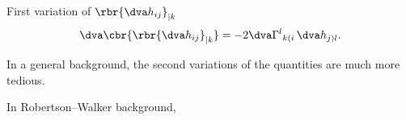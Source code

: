 \documentclass[a4paper,11pt]{article}
\begin{document}
First variation of $\rbr{\dva h_{ij}}_{|k}$
\begin{align}
\dva\cbr{\rbr{\dva h_{ij}}_{|k}} = -2 \dva\Gamma^l{}_{k(i}\,\dva h_{j)l}.
\end{align}



In a general background, the second variations of the quantities are much more 
tedious.

In Robertson--Walker background, 


\printbibliography
\end{document}

